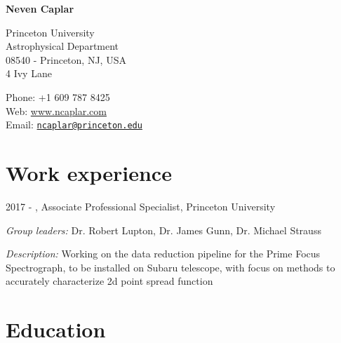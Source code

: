 \documentclass[11pt,letterpaper]{article}
\def\name{\textbf{Neven Caplar}}
\renewenvironment{itemize}{
  \begin{list}{}{
    \setlength{\leftmargin}{1.5em}
    \setlength{\itemsep}{0.10em}
    \setlength{\parskip}{0pt}
    \setlength{\parsep}{0.10em}
  }
}{
  \end{list}
}
\begin{document}
{\huge \name}


\bigskip

\begin{minipage}[t]{0.645\textwidth}
  Princeton University\\
  Astrophysical Department \\
  08540 - Princeton, NJ, USA	 \\
	4 Ivy Lane
\end{minipage}
\begin{minipage}[t]{0.345\textwidth}
  Phone: +1 609 787 8425 \\
  Web: \href{ www.ncaplar.com}{www.ncaplar.com} \\
  Email: \href{ncaplar@princeton.edu}{\nolinkurl{ncaplar@princeton.edu}} \\

\end{minipage}


\section*{Work experience}

\begin{itemize}
  \item 2017 - , Associate Professional Specialist, Princeton University
  \item \textit{Group leaders:} Dr. Robert Lupton, Dr. James Gunn, Dr. Michael Strauss 
  \item \textit{Description:} Working on the data reduction pipeline for the Prime Focus Spectrograph, to be installed on Subaru telescope, with focus on methods to accurately characterize 2d point spread function 
\end{itemize}  


\section*{Education}
\end{document}
